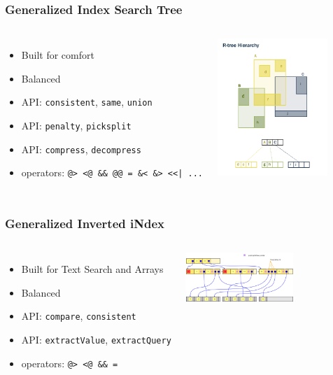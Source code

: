 \documentclass{beamer}
\begin{document}
\begin{frame}[fragile]
  \frametitle{Generalized Index Search Tree}

  \vfill

\begin{columns}[c]

  \begin{itemize}
  \item Built for comfort
  \item Balanced
  \item API: \texttt{consistent}, \texttt{same}, \texttt{union}
  \item API: \texttt{penalty}, \texttt{picksplit}
  \item API: \texttt{compress}, \texttt{decompress}
  \item operators: \texttt{@> <@ \&\& @@ = \&< \&> <<| ...}
  \end{itemize}

\begin{center}
  \includegraphics[height=14em]{rtree.png}
\end{center}
\end{columns}
\end{frame}


\begin{frame}[fragile]
  \frametitle{Generalized Inverted iNdex}

  \vfill

\begin{columns}[c]

  \begin{itemize}
  \item Built for Text Search and Arrays
  \item Balanced
  \item API: \texttt{compare}, \texttt{consistent}
  \item API: \texttt{extractValue}, \texttt{extractQuery}
  \item operators: \texttt{@> <@ \&\& =}
  \end{itemize}

\begin{center}
  \includegraphics[height=5em]{gin.png}
\end{center}
\end{columns}
\end{frame}
\end{document}
